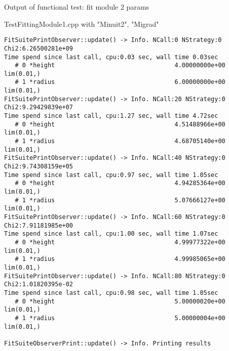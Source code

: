 Output of functional test: fit module 2 params

TestFittingModule1.cpp with "Minuit2", "Migrad"

\begin{lstlisting}[style=eclipse,numbers=none]
FitSuitePrintObserver::update() -> Info. NCall:0 NStrategy:0 Chi2:6.26500281e+09
Time spend since last call, cpu:0.03 sec, wall time 0.03sec
   # 0 *height                                 4.00000000e+00  lim(0.01,)
   # 1 *radius                                 6.00000000e+00  lim(0.01,)
FitSuitePrintObserver::update() -> Info. NCall:20 NStrategy:0 Chi2:9.29429839e+07
Time spend since last call, cpu:1.27 sec, wall time 4.72sec
   # 0 *height                                 4.51488966e+00  lim(0.01,)
   # 1 *radius                                 4.68705140e+00  lim(0.01,)
FitSuitePrintObserver::update() -> Info. NCall:40 NStrategy:0 Chi2:9.74308159e+05
Time spend since last call, cpu:0.97 sec, wall time 1.05sec
   # 0 *height                                 4.94285364e+00  lim(0.01,)
   # 1 *radius                                 5.07666127e+00  lim(0.01,)
FitSuitePrintObserver::update() -> Info. NCall:60 NStrategy:0 Chi2:7.91181985e+00
Time spend since last call, cpu:1.00 sec, wall time 1.07sec
   # 0 *height                                 4.99977322e+00  lim(0.01,)
   # 1 *radius                                 4.99985065e+00  lim(0.01,)
FitSuitePrintObserver::update() -> Info. NCall:80 NStrategy:0 Chi2:1.01820395e-02
Time spend since last call, cpu:0.98 sec, wall time 1.05sec
   # 0 *height                                 5.00000020e+00  lim(0.01,)
   # 1 *radius                                 5.00000004e+00  lim(0.01,)

FitSuiteObserverPrint::update() -> Info. Printing results


\end{lstlisting}
